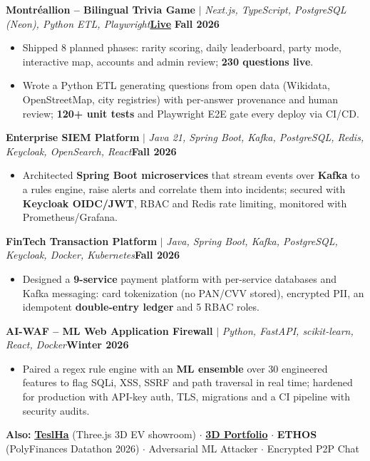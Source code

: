 \documentclass[letterpaper,9pt]{extarticle}
\newcommand{\project}[3]{%
  \vspace{1.5pt}\noindent\textbf{#1} $|$ \textit{#2}\hfill#3\par\vspace{-1pt}}
\begin{document}
\project{Montr\'eallion -- Bilingual Trivia Game}{Next.js, TypeScript, PostgreSQL (Neon), Python ETL, Playwright}{\href{https://montreallion.vercel.app}{\textbf{Live}} \textbf{Fall 2026}}
\begin{itemize}
  \item Shipped 8 planned phases: rarity scoring, daily leaderboard, party mode, interactive map, accounts and admin review; \textbf{230 questions live}.
  \item Wrote a Python ETL generating questions from open data (Wikidata, OpenStreetMap, city registries) with per-answer provenance and human review; \textbf{120+ unit tests} and Playwright E2E gate every deploy via CI/CD.
\end{itemize}

\project{Enterprise SIEM Platform}{Java 21, Spring Boot, Kafka, PostgreSQL, Redis, Keycloak, OpenSearch, React}{\textbf{Fall 2026}}
\begin{itemize}
  \item Architected \textbf{Spring Boot microservices} that stream events over \textbf{Kafka} to a rules engine, raise alerts and correlate them into incidents; secured with \textbf{Keycloak OIDC/JWT}, RBAC and Redis rate limiting, monitored with Prometheus/Grafana.
\end{itemize}

\project{FinTech Transaction Platform}{Java, Spring Boot, Kafka, PostgreSQL, Keycloak, Docker, Kubernetes}{\textbf{Fall 2026}}
\begin{itemize}
  \item Designed a \textbf{9-service} payment platform with per-service databases and Kafka messaging: card tokenization (no PAN/CVV stored), encrypted PII, an idempotent \textbf{double-entry ledger} and 5 RBAC roles.
\end{itemize}

\project{AI-WAF -- ML Web Application Firewall}{Python, FastAPI, scikit-learn, React, Docker}{\textbf{Winter 2026}}
\begin{itemize}
  \item Paired a regex rule engine with an \textbf{ML ensemble} over 30 engineered features to flag SQLi, XSS, SSRF and path traversal in real time; hardened for production with API-key auth, TLS, migrations and a CI pipeline with security audits.
\end{itemize}

\textbf{Also:} \href{https://teslha.onrender.com}{\textbf{TeslHa}} (Three.js 3D EV showroom) $\cdot$
\href{https://samuel-ha-portfolio.onrender.com}{\textbf{3D Portfolio}} $\cdot$
\textbf{ETHOS} (PolyFinances Datathon 2026) $\cdot$
Adversarial ML Attacker $\cdot$ Encrypted P2P Chat
\end{document}
